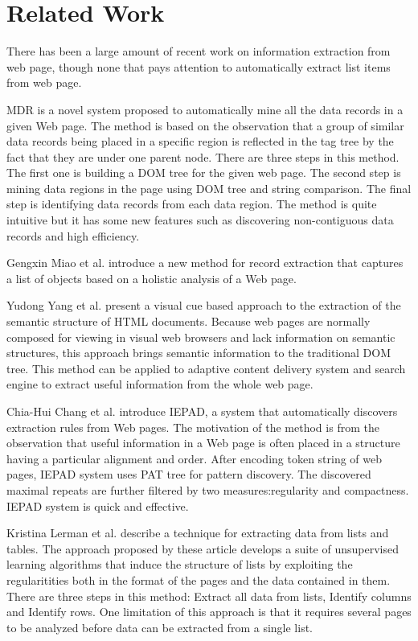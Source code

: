 \section{Related Work}

There has been a large amount of recent work on information extraction from web page, though none that pays attention to automatically extract list items from web page.

MDR \cite{LiuGZ03:MDR} is a novel system proposed to automatically mine all the data records in a given Web page. The method is based on the observation that a group of similar data records being placed in a specific region is reflected in the tag tree by the fact that they are under one parent node. There are three steps in this method. The first one is building a DOM tree for the given web page. The second step is mining data regions in the page using DOM tree and string comparison. The final step is identifying data records from each data region. The method is quite intuitive but it  has some new features such as discovering non-contiguous data records and high efficiency.

Gengxin Miao et al. \cite{MiaoTHSM09:TagPathClustering} introduce a new method for record extraction that captures a list of objects based on a holistic analysis of a Web page. 

Yudong Yang et al. \cite{YangZ01:VisualCues} present a visual cue based approach to the extraction of the semantic structure of HTML documents.
Because web pages are normally composed for viewing in visual web browsers and lack information on semantic structures, this approach brings semantic information to the traditional DOM tree.
This method can be applied to adaptive content delivery system and search engine to extract useful information from the whole web page.

Chia-Hui Chang et al. \cite{ChangL01:IEPAD} introduce IEPAD, a system that automatically discovers extraction rules from Web pages. The motivation of the method is from the observation that useful information in a Web page is often placed in a structure having a particular alignment and order. After encoding token string of web pages, IEPAD system uses PAT tree for pattern discovery. The discovered maximal repeats are further filtered by two measures:regularity and compactness. IEPAD system is quick and effective.

Kristina Lerman et al.\cite{Lerman01:AutomaticData} describe a technique for extracting data from lists and tables. The approach proposed by these article develops a suite of unsupervised learning algorithms that induce the structure of lists by exploiting the regularitities both in the format of the pages and the data contained in them. There are three steps in this method: Extract all data from lists, Identify columns and Identify rows. One limitation of this approach is that it requires several pages to be analyzed before data can be extracted from a single list.

